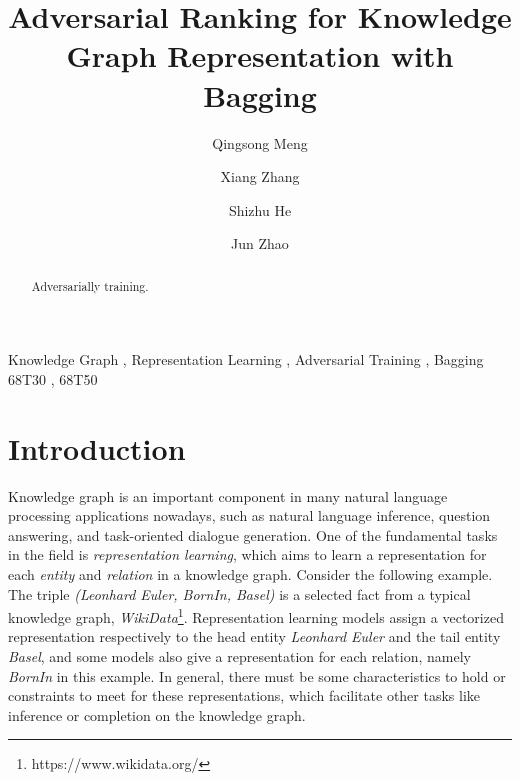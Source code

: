\documentclass[twocolumn,a4paper,10pt,review,3p]{elsarticle}
\begin{document}

\begin{frontmatter}

\title{Adversarial Ranking for Knowledge Graph Representation with Bagging}


\author[hrbaddress]{Qingsong Meng}

\author[ucasaddress,hrbaddress]{Xiang Zhang}

\author[ucasaddress]{Shizhu He}

\author[ucasaddress]{Jun Zhao}

\address[hrbaddress]{Harbin University of Science and Technology, No.52 Xuefu Road, Nangang District, Harbin, 150080, China}
\address[ucasaddress]{University of Chinese Academy of Sciences, No.19(A) Yuquan Road, Shijingshan District, Beijing, P.R.China 100049}


\begin{abstract}
Adversarially training.
\end{abstract}

\begin{keyword}
Knowledge Graph \sep{} Representation Learning \sep{} Adversarial Training \sep{} Bagging
\MSC[2010] 68T30 \sep{} 68T50
\end{keyword}

\end{frontmatter}


\linenumbers{}


\section{Introduction}

Knowledge graph is an important component in many natural language processing applications nowadays, such as natural language inference, question answering, and task-oriented dialogue generation. One of the fundamental tasks in the field is \emph{representation learning}, which aims to learn a representation for each \emph{entity} and \emph{relation} in a knowledge graph. Consider the following example. The triple \emph{(Leonhard Euler, BornIn, Basel)} is a selected fact from a typical knowledge graph, \emph{WikiData}\footnote{https://www.wikidata.org/}. Representation learning models assign a vectorized representation respectively to the head entity \emph{Leonhard Euler} and the tail entity \emph{Basel}, and some models also give a representation for each relation, namely \emph{BornIn} in this example. In general, there must be some characteristics to hold or constraints to meet for these representations, which facilitate other tasks like inference or completion on the knowledge graph.
\end{document}
